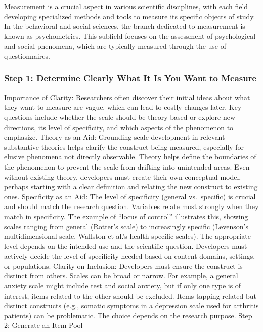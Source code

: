 \documentclass[
]{article}
\begin{document}
Measurement is a crucial aspect in various scientific disciplines, with
each field developing specialized methods and tools to measure its
specific objects of study. In the behavioral and social sciences, the
branch dedicated to measurement is known as psychometrics. This subfield
focuses on the assessment of psychological and social phenomena, which
are typically measured through the use of questionnaires.

\hypertarget{step-1-determine-clearly-what-it-is-you-want-to-measure}{%
\subsubsection{Step 1: Determine Clearly What It Is You Want to
Measure}\label{step-1-determine-clearly-what-it-is-you-want-to-measure}}

Importance of Clarity: Researchers often discover their initial ideas
about what they want to measure are vague, which can lead to costly
changes later. Key questions include whether the scale should be
theory-based or explore new directions, its level of specificity, and
which aspects of the phenomenon to emphasize. Theory as an Aid:
Grounding scale development in relevant substantive theories helps
clarify the construct being measured, especially for elusive phenomena
not directly observable. Theory helps define the boundaries of the
phenomenon to prevent the scale from drifting into unintended areas.
Even without existing theory, developers must create their own
conceptual model, perhaps starting with a clear definition and relating
the new construct to existing ones. Specificity as an Aid: The level of
specificity (general vs.~specific) is crucial and should match the
research question. Variables relate most strongly when they match in
specificity. The example of ``locus of control'' illustrates this,
showing scales ranging from general (Rotter's scale) to increasingly
specific (Levenson's multidimensional scale, Wallston et al.'s
health-specific scales). The appropriate level depends on the intended
use and the scientific question. Developers must actively decide the
level of specificity needed based on content domains, settings, or
populations. Clarity on Inclusion: Developers must ensure the construct
is distinct from others. Scales can be broad or narrow. For example, a
general anxiety scale might include test and social anxiety, but if only
one type is of interest, items related to the other should be excluded.
Items tapping related but distinct constructs (e.g., somatic symptoms in
a depression scale used for arthritis patients) can be problematic. The
choice depends on the research purpose. Step 2: Generate an Item Pool
\end{document}
